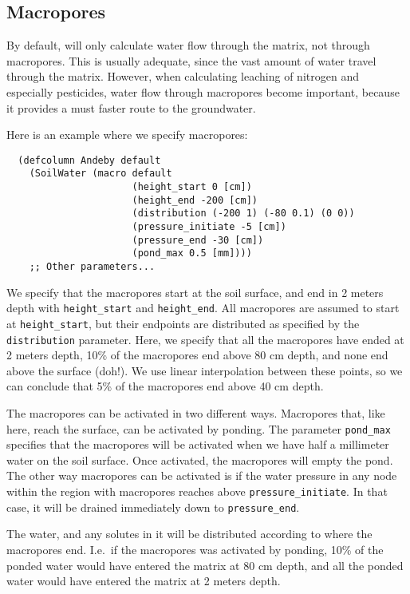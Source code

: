 \documentclass[a4paper,11pt]{article}
\begin{document}
\subsection{Macropores}
\label{sec:macro}

By default, \daisy{} will only calculate water flow through the
matrix, not through macropores.  This is usually adequate, since the
vast amount of water travel through the matrix.  However, when
calculating leaching of nitrogen and especially pesticides, water flow
through macropores become important, because it provides a must faster
route to the groundwater.

Here is an example where we specify macropores:
\begin{verbatim}
  (defcolumn Andeby default
    (SoilWater (macro default
                      (height_start 0 [cm])
                      (height_end -200 [cm])
                      (distribution (-200 1) (-80 0.1) (0 0))
                      (pressure_initiate -5 [cm])
                      (pressure_end -30 [cm])
                      (pond_max 0.5 [mm])))
    ;; Other parameters...
\end{verbatim}

We specify that the macropores start at the soil surface, and end in 2
meters depth with \texttt{height\_start} and \texttt{height\_end}.  All
macropores are assumed to start at \texttt{height\_start}, but their
endpoints are distributed as specified by the \texttt{distribution}
parameter.  Here, we specify that all the macropores have ended at 2
meters depth, 10\% of the macropores end above 80 cm depth, and none
end above the surface (doh!).  We use linear interpolation between
these points, so we can conclude that 5\% of the macropores end above
40 cm depth.

The macropores can be activated in two different ways.  Macropores
that, like here, reach the surface, can be activated by ponding.  The
parameter \texttt{pond\_max} specifies that the macropores will be
activated when we have half a millimeter water on the soil surface.
Once activated, the macropores will empty the pond.  The other way
macropores can be activated is if the water pressure in any node
within the region with macropores reaches above
\texttt{pressure\_initiate}.  In that case, it will be drained
immediately down to \texttt{pressure\_end}.

The water, and any solutes in it will be distributed according to
where the macropores end.  I.e.\ if the macropores was activated by
ponding, 10\% of the ponded water would have entered the matrix at 80
cm depth, and all the ponded water would have entered the matrix at 2
meters depth.
\end{document}
